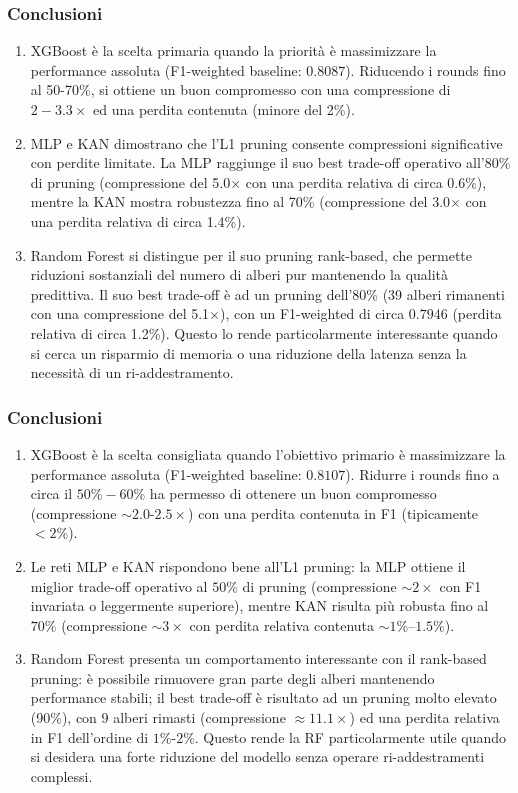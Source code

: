 \documentclass[a4paper,12pt]{report}
\begin{document}
	\subsubsection{Conclusioni}
	\begin{enumerate}
		\item XGBoost è la scelta primaria quando la priorità è massimizzare la performance assoluta (F1-weighted baseline: $0.8087$). Riducendo i rounds fino al 50-70\%, si ottiene un buon compromesso con una compressione di $2-3.3\times$ ed una perdita contenuta (minore del 2\%).
		\item MLP e KAN dimostrano che l'L1 pruning consente compressioni significative con perdite limitate. La MLP raggiunge il suo best trade-off operativo all'80\% di pruning (compressione del 5.0$\times$ con una perdita relativa di circa 0.6\%), mentre la KAN mostra robustezza fino al 70\% (compressione del 3.0$\times$ con una perdita relativa di circa 1.4\%).
		\item Random Forest si distingue per il suo pruning rank-based, che permette riduzioni sostanziali del numero di alberi pur mantenendo la qualità predittiva. Il suo best trade-off è ad un pruning dell'80\% (39 alberi rimanenti con una compressione del 5.1$\times$), con un F1-weighted di circa $0.7946$ (perdita relativa di circa 1.2\%). Questo lo rende particolarmente interessante quando si cerca un risparmio di memoria o una riduzione della latenza senza la necessità di un ri-addestramento.
	\end{enumerate}
	
	\subsubsection{Conclusioni}
	\begin{enumerate}
		\item XGBoost è la scelta consigliata quando l'obiettivo primario è massimizzare la performance assoluta (F1-weighted baseline: $0.8107$). Ridurre i rounds fino a circa il $50\%-60\%$ ha permesso di ottenere un buon compromesso (compressione $\sim 2.0$-$2.5\times$) con una perdita contenuta in F1 (tipicamente $<2\%$).
		\item Le reti MLP e KAN rispondono bene all'L1 pruning: la MLP ottiene il miglior trade-off operativo al $50\%$ di pruning (compressione $\sim 2\times$ con F1 invariata o leggermente superiore), mentre KAN risulta più robusta fino al $70\%$ (compressione $\sim 3\times$ con perdita relativa contenuta $\sim 1\%$--$1.5\%$).
		\item Random Forest presenta un comportamento interessante con il rank-based pruning: è possibile rimuovere gran parte degli alberi mantenendo performance stabili; il best trade-off è risultato ad un pruning molto elevato (90\%), con 9 alberi rimasti (compressione $\approx 11.1\times$) ed una perdita relativa in F1 dell'ordine di $1\%$-$2\%$. Questo rende la RF particolarmente utile quando si desidera una forte riduzione del modello senza operare ri-addestramenti complessi.
	\end{enumerate}
	
\end{document}
